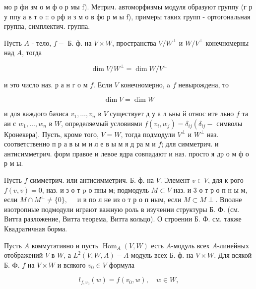 \documentclass[10pt]{article}
\begin{document}
мо р фи зм о м ф о р мы f). Метрич. автоморфизмы модуля образуют группу (г р у ппу а в т о :: о рф и з м о в фо р м ы f), примеры таких групп - ортогональная группа, симплектич. группа.



Пусть $A$ - тело, $f-$ Б. ф. на $V \times W$, пространства $V / W^{\perp}$ и $W / V^{\perp}$ конечномерны над $A$, тогда



\[

\operatorname{dim} V / W^{\perp}=\operatorname{dim} W / V^{\perp}

\]



и это число наз. р а н г о м $f$. Если $V$ конечномерно, a $f$ невырождена, то



\[

\operatorname{dim} V=\operatorname{dim} W

\]



и для каждого базиса $v_{1}, \ldots, v_{n}$ в $V$ существует д у а л ьны й относ ите льно $f$ та аи с $w_{1}, \ldots, w_{n}$ в $W$, определяемый условиями $f\left(v_{i}, w_{j}\right)=\delta_{i j}\left(\delta_{i j}-\right.$ символы Кронекера). Пусть, кроме того, $V=W$, тогда подмодули $V^{\perp}$ и $W^{\perp}$ наз. соответственно п р а в ы м и л е в ы м я д ра м и $f$; для симметрич. и антисимметрич. форм правое и левое ядра совпадают и наз. просто я др о м ф о р м ы.



Пусть $f$ симметрич. или антисимметрич. Б. ф. на $V$. Элемент $v \in V$, для к-рого $f(v, v)=0$, наз. и з о т $\mathrm{p}$ о пны м; подмодуль $M \subset V$ наз. и 3 о т р о п н ы м, если $M \cap M^{\perp} \neq\{0\}, \quad$ и в по л не из о т р о п ным, если $M \subset M \perp$. Вполне изотропные подмодули играют важную роль в изучении структуры Б. Ф. (см. Витта разложение, Витта теорема, Витта кольцо). О строении Б. Ф. см. также Квадратичная борма.



Пусть $A$ коммутативно и пусть $\operatorname{Hom}_{A}(V, W)$ есть $A$-модуль всех $A$-линейных отображений $V$ в $W$, а $L^{2}(V, W, A)-A$-модуль всех Б. ф. на $V \times W$. Для всякой Б. Ф. $f$ на $V \times W$ и всякого $v_{0} \in V$ формула



\[

l_{f, v_{0}}(w)=f\left(v_{0}, w\right), \quad w \in W,

\]
\end{document}

